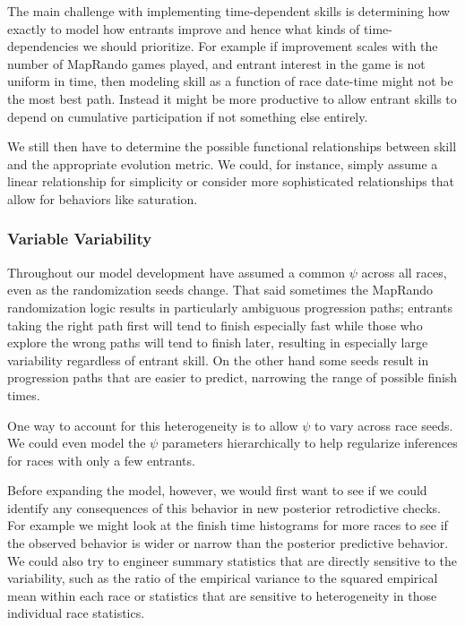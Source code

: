 \documentclass[
  letterpaper,
  DIV=11,
  numbers=noendperiod]{scrartcl}
\begin{document}
The main challenge with implementing time-dependent skills is
determining how exactly to model how entrants improve and hence what
kinds of time-dependencies we should prioritize. For example if
improvement scales with the number of MapRando games played, and entrant
interest in the game is not uniform in time, then modeling skill as a
function of race date-time might not be the most best path. Instead it
might be more productive to allow entrant skills to depend on cumulative
participation if not something else entirely.

We still then have to determine the possible functional relationships
between skill and the appropriate evolution metric. We could, for
instance, simply assume a linear relationship for simplicity or consider
more sophisticated relationships that allow for behaviors like
saturation.

\subsubsection{Variable Variability}\label{variable-variability}

Throughout our model development have assumed a common \(\psi\) across
all races, even as the randomization seeds change. That said sometimes
the MapRando randomization logic results in particularly ambiguous
progression paths; entrants taking the right path first will tend to
finish especially fast while those who explore the wrong paths will tend
to finish later, resulting in especially large variability regardless of
entrant skill. On the other hand some seeds result in progression paths
that are easier to predict, narrowing the range of possible finish
times.

One way to account for this heterogeneity is to allow \(\psi\) to vary
across race seeds. We could even model the \(\psi\) parameters
hierarchically to help regularize inferences for races with only a few
entrants.

Before expanding the model, however, we would first want to see if we
could identify any consequences of this behavior in new posterior
retrodictive checks. For example we might look at the finish time
histograms for more races to see if the observed behavior is wider or
narrow than the posterior predictive behavior. We could also try to
engineer summary statistics that are directly sensitive to the
variability, such as the ratio of the empirical variance to the squared
empirical mean within each race or statistics that are sensitive to
heterogeneity in those individual race statistics.
\end{document}
